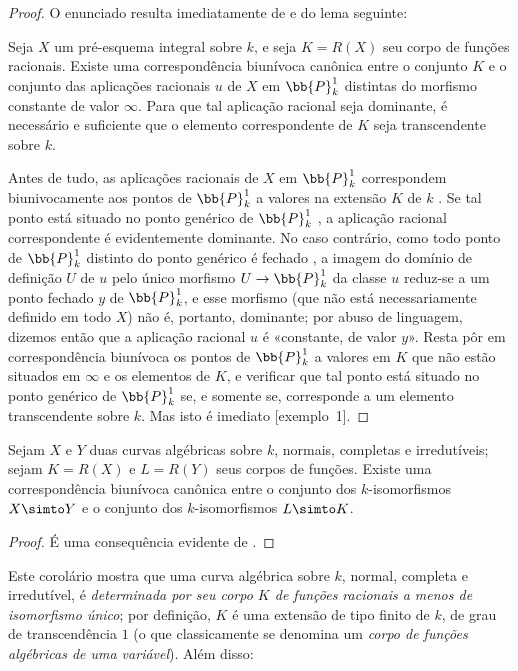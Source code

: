 \documentclass[oneside,10pt]{amsart}
\makeatletter
\newcommand{\ega@arrow}[2]{\mathchoice{#1}{#2}{#2}{#2}}
\renewcommand{\to}{\ega@arrow{\longrightarrow}{\rightarrow}}
\newcommand{\oldpage}[2][]{\marginnote{\normalfont\footnotesize\textbf{#1}~|~#2}\ignorespaces}
\let\EGAOriginalLabel\label
\renewcommand{\label}[1]{\phantomsection\EGAOriginalLabel{#1}}
\makeatother
\begin{document}
\begin{proof}
O enunciado resulta imediatamente de  e do lema seguinte:
\begin{lemma}[7.4.15.1]
\label{II.7.4.15.1}
Seja $X$ um pré-esquema integral sobre $k$, e seja $K=R(X)$ seu corpo de funções racionais.
Existe uma correspondência biunívoca canônica entre o conjunto $K$ e o conjunto das aplicações racionais $u$ de $X$ em $\bb{P}_k^1$ distintas do morfismo constante de valor $\infty$.
Para que tal aplicação racional seja dominante, é necessário e suficiente que o elemento correspondente de $K$ seja transcendente sobre $k$.
\end{lemma}
Antes de tudo, as aplicações racionais de $X$ em $\bb{P}_k^1$ correspondem biunivocamente aos pontos de $\bb{P}_k^1$ a valores na extensão $K$ de $k$ .
Se tal ponto está situado no ponto genérico de $\bb{P}_k^1$ , a aplicação racional correspondente é evidentemente dominante.
No caso contrário, como todo ponto de $\bb{P}_k^1$ distinto do ponto genérico é fechado , a imagem do domínio de definição $U$ de $u$ pelo único morfismo $U\to\bb{P}_k^1$ da classe $u$  reduz-se a um ponto fechado $y$ de $\bb{P}_k^1$, e esse morfismo (que não está necessariamente definido em todo $X$) não é, portanto, dominante;
por abuso de linguagem, dizemos então que a aplicação racional $u$ é «constante, de valor $y$».
Resta pôr em correspondência biunívoca os pontos de $\bb{P}_k^1$ a valores em $K$ que não estão situados em $\infty$  e os elementos de $K$, e verificar que tal ponto está situado no ponto genérico de $\bb{P}_k^1$ se, e somente se, corresponde a um
\oldpage[II]{152}
elemento transcendente sobre $k$.
Mas isto é imediato [exemplo~1].
\end{proof}

\begin{corollary}[7.4.16]
\label{II.7.4.16}
Sejam $X$ e $Y$ duas curvas algébricas sobre $k$, normais, completas e irredutíveis;
sejam $K=R(X)$ e $L=R(Y)$ seus corpos de funções.
Existe uma correspondência biunívoca canônica entre o conjunto dos $k$-isomorfismos $X\simto Y$ e o conjunto dos $k$-isomorfismos $L\simto K$.
\end{corollary}

\begin{proof}
É uma consequência evidente de .
\end{proof}

\begin{env}[7.4.17]
\label{II.7.4.17}
Este corolário  mostra que uma curva algébrica sobre $k$, normal, completa e irredutível, é \emph{determinada por seu corpo $K$ de funções racionais a menos de isomorfismo único};
por definição, $K$ é uma extensão de tipo finito de $k$, de grau de transcendência $1$ (o que classicamente se denomina um \emph{corpo de funções algébricas de uma variável}).
Além disso:
\end{env}
\end{document}
